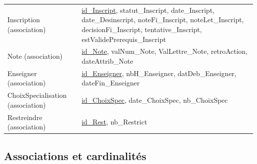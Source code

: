 \documentclass[11pt,a4paper]{article}
\begin{document}
\begin{longtable}{@{}p{3.4cm} p{11.8cm}@{}}
Inscription (association) &
    \underline{id\_Inscript}, statut\_Inscript, date\_Inscript,
    date\_Desinscript, noteFi\_Inscript, noteLet\_Inscript,
    decisionFi\_Inscript, tentative\_Inscript,
    estValidePrerequis\_Inscript \\

Note (association) &
    \underline{id\_Note}, valNum\_Note, ValLettre\_Note, retroAction,
    dateAttrib\_Note \\

Enseigner (association) &
    \underline{id\_Enseigner}, nbH\_Enseigner, datDeb\_Enseigner,
    dateFin\_Enseigner \\

ChoixSpecialisation (association) &
    \underline{id\_ChoixSpec}, date\_ChoixSpec, nb\_ChoixSpec \\

Restreindre (association) &
    \underline{id\_Rest}, nb\_Restrict \\

\bottomrule
\end{longtable}

\subsection{Associations et cardinalités}
\end{document}
